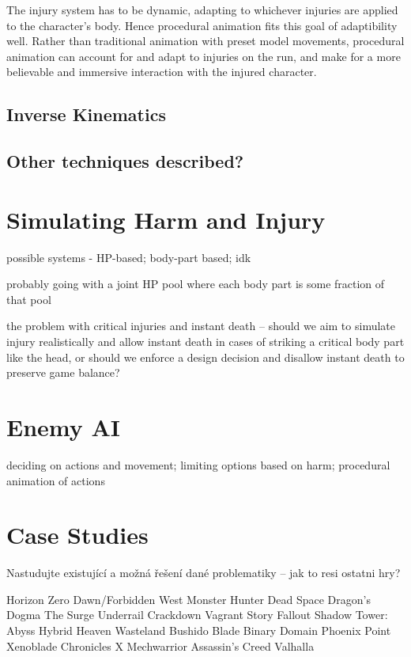 The injury system has to be dynamic, adapting to whichever injuries are applied to the character's body. Hence procedural animation fits this goal of adaptibility well. Rather than traditional animation with preset model movements, procedural animation can account for and adapt to injuries on the run, and make for a more believable and immersive interaction with the injured character.

\subsection{Inverse Kinematics}
\subsection{Other techniques described?}

\section{Simulating Harm and Injury}
possible systems - HP-based; body-part based; idk

probably going with a joint HP pool where each body part is some fraction of that pool

the problem with critical injuries and instant death -- should we aim to simulate injury realistically and allow instant death in cases of striking a critical body part like the head, or should we enforce a design decision and disallow instant death to preserve game balance?

\section{Enemy AI}
deciding on actions and movement; limiting options based on harm; procedural animation of actions

\section{Case Studies}
Nastudujte existující a možná řešení dané problematiky -- jak to resi ostatni hry?

Horizon Zero Dawn/Forbidden West
Monster Hunter
Dead Space
Dragon's Dogma
The Surge
Underrail
Crackdown
Vagrant Story
Fallout
Shadow Tower: Abyss
Hybrid Heaven
Wasteland
Bushido Blade
Binary Domain
Phoenix Point
Xenoblade Chronicles X
Mechwarrior
Assassin's Creed Valhalla


